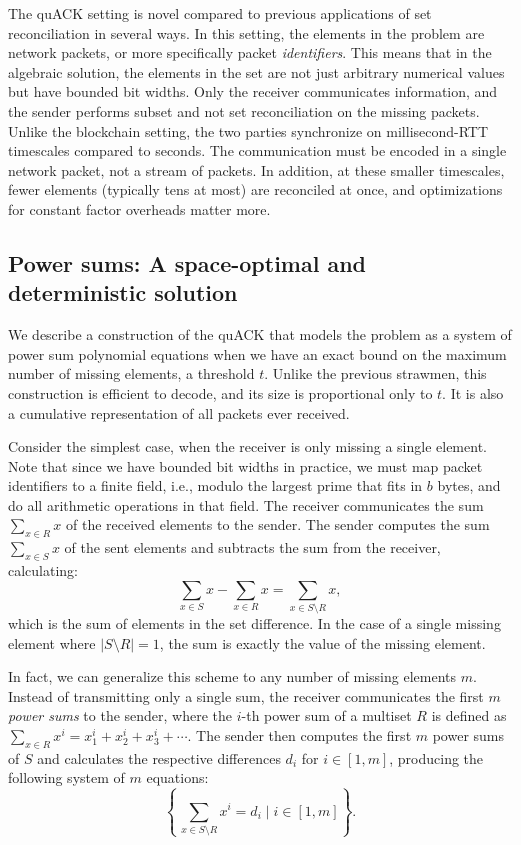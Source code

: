 The quACK setting is novel compared to previous applications of set
reconciliation in several ways. In this setting, the elements in the problem
are network packets, or more specifically packet \textit{identifiers}. This
means that in the algebraic solution, the elements in the set are not just
arbitrary numerical values but have bounded bit widths. Only the receiver
communicates information, and the sender performs subset and not set
reconciliation on the missing packets. Unlike the blockchain setting, the two
parties synchronize on millisecond-RTT timescales compared to seconds. The
communication must be encoded in a single network packet, not a stream of
packets. In addition, at these smaller timescales, fewer elements
(typically tens at most) are reconciled at once, and optimizations for constant
factor overheads matter more.

\subsection{Power sums: A space-optimal and deterministic solution}
\label{sec:quack:constructions:power-sum}

We describe a construction of the quACK that models the problem as a system of
power sum polynomial equations when we have an exact bound on the maximum
number of missing elements, a threshold $t$. Unlike the previous strawmen, this
construction is efficient to decode, and its size is proportional only to $t$.
It is also a cumulative representation of all packets ever received.

Consider the simplest case, when the receiver is only missing a single element.
Note that since we have bounded bit widths in practice, we must map packet
identifiers to a finite field, i.e., modulo the largest prime that fits in $b$
bytes, and do all arithmetic operations in that field.
The receiver communicates the sum $\sum_{x \in R} x$ of the received elements to
the sender. The sender computes the sum $\sum_{x \in S} x$ of the sent elements
and subtracts the sum from the receiver, calculating:
\[
    \sum_{x \in S} x - \sum_{x \in R} x = \sum_{x \in S\setminus R} x,
\]
which is the sum of elements in the set difference. In the case of a single
missing element where $|S \setminus R| = 1$, the sum is exactly the value of
the missing element.

In fact, we can generalize this scheme to any number of missing elements $m$.
Instead of transmitting only a single sum, the receiver communicates
the first $m$ \emph{power sums} to the sender, where the $i$-th power sum of a
multiset $R$ is defined as $\sum_{x \in R} x^i = x_1^i + x_2^i + x_3^i + \cdots$.
The sender then computes the first $m$ power sums of $S$ and calculates the
respective differences $d_i$ for $i \in [1,m]$, producing the following
system of $m$ equations:
\[
    \left\{\, \sum_{x \in S\setminus R} x^i = d_i \mid i \in [1,m] \right\}.
\]

